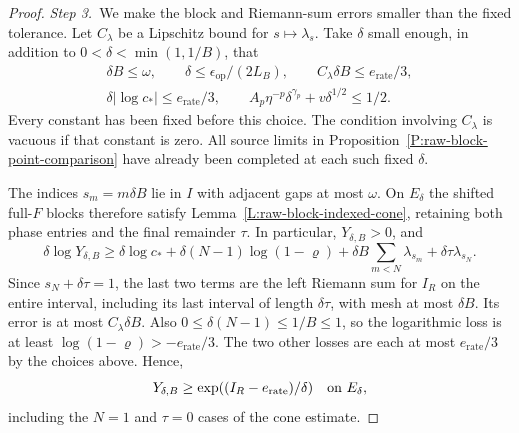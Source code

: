 \begin{proof}
  \medskip
  \noindent\textit{Step 3.~}We make the block and Riemann-sum errors smaller
  than the fixed tolerance.
  Let $C_\lambda$ be a Lipschitz bound for $s\mapsto\lambda_s$. Take $\delta$
  small enough, in addition to $0 < \delta < \min(1,1/B)$, that
  \[
    \begin{gathered}
      \delta B\le\omega,\qquad
      \delta\le\epsilon_{\mathrm{op}}/(2L_B),\qquad
      C_\lambda\delta B\le e_{\mathrm{rate}}/3,\\
      \delta|\log c_*|\le e_{\mathrm{rate}}/3,\qquad
      A_p\eta^{-p}\delta^{\gamma_p}+v\delta^{1/2}\le1/2.
    \end{gathered}
  \]
  Every constant has been fixed before this choice. The condition involving
  $C_\lambda$ is vacuous if that constant is zero. All source limits in
  Proposition~\ref{P:raw-block-point-comparison} have already been completed at
  each such fixed $\delta$.

  The indices $s_m = m\delta B$ lie in $I$ with adjacent gaps at most $\omega$.
  On $E_\delta$ the shifted full-$F$ blocks therefore satisfy
  Lemma~\ref{L:raw-block-indexed-cone}, retaining both phase entries and the
  final remainder $\tau$. In particular, $Y_{\delta,B} > 0$, and
  \[
    \delta\log Y_{\delta,B}
    \ge\delta\log c_*+\delta(N-1)\log(1-\varrho)
    +\delta B\sum_{m<N}\lambda_{s_m}
    +\delta\tau\lambda_{s_N}.
  \]
  Since $s_N+\delta\tau = 1$, the last two terms are the left Riemann sum for
  $I_R$ on the entire interval, including its last interval of length
  $\delta\tau$, with mesh at most $\delta B$. Its error is at most
  $C_\lambda\delta B$. Also $0 \le \delta(N-1) \le 1/B \le 1$, so the
  logarithmic loss is at least $\log(1-\varrho) > -e_{\mathrm{rate}}/3$. The two
  other losses are each at most $e_{\mathrm{rate}}/3$ by the choices above.
  Hence,
  \[
    Y_{\delta,B}\ge
    \exp((I_R-e_{\mathrm{rate}})/\delta)\quad\hbox{on }E_\delta,
  \]
  including the $N = 1$ and $\tau = 0$ cases of the cone estimate.



\end{proof}
